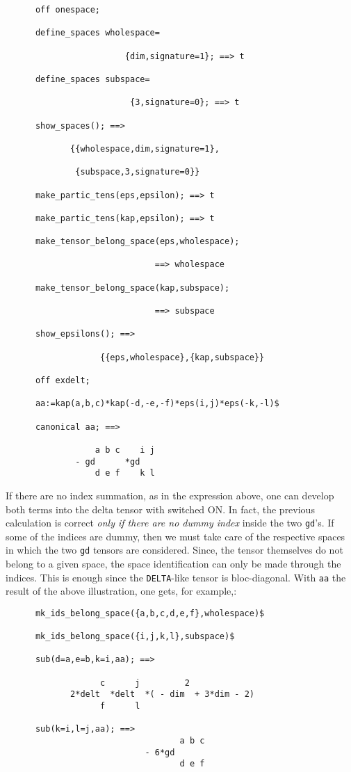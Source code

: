 \begin{verbatim}
      off onespace;

      define_spaces wholespace=

                        {dim,signature=1}; ==> t

      define_spaces subspace=

                         {3,signature=0}; ==> t

      show_spaces(); ==>

             {{wholespace,dim,signature=1},

              {subspace,3,signature=0}}

      make_partic_tens(eps,epsilon); ==> t

      make_partic_tens(kap,epsilon); ==> t

      make_tensor_belong_space(eps,wholespace);

                              ==> wholespace

      make_tensor_belong_space(kap,subspace);

                              ==> subspace

      show_epsilons(); ==>

                   {{eps,wholespace},{kap,subspace}}

      off exdelt;

      aa:=kap(a,b,c)*kap(-d,-e,-f)*eps(i,j)*eps(-k,-l)$

      canonical aa; ==>

                  a b c    i j
              - gd      *gd
                  d e f    k l
\end{verbatim}
If there are no index summation, as in the expression above, one can
develop both terms into the delta tensor with %
 switched ON.
In fact, the previous calculation is correct \emph{only if there are no
dummy index} inside the two \texttt{gd}'s.
If some of the indices are
dummy, then
we must
take care of the respective spaces in which the two \texttt{gd} tensors
are considered. Since, the tensor themselves do not belong
to a given space, the space identification can only be made through
the indices. This is enough since the \texttt{DELTA}-like tensor
is bloc-diagonal. With \texttt{aa} the result of the above illustration,
one gets, for example,:
\begin{verbatim}
      mk_ids_belong_space({a,b,c,d,e,f},wholespace)$

      mk_ids_belong_space({i,j,k,l},subspace)$

      sub(d=a,e=b,k=i,aa); ==>

                   c      j         2
             2*delt  *delt  *( - dim  + 3*dim - 2)
                   f      l

      sub(k=i,l=j,aa); ==>
                                   a b c
                            - 6*gd
                                   d e f
\end{verbatim}

